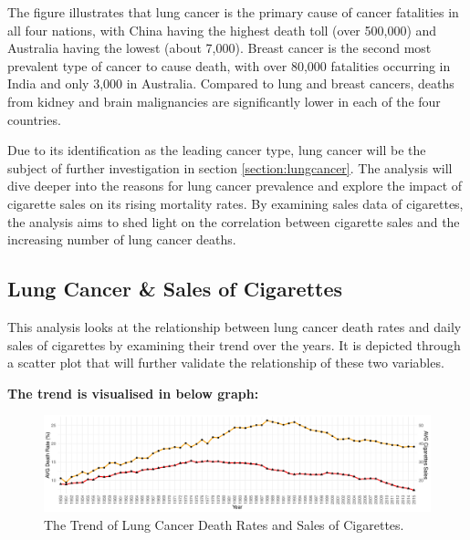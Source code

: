 \documentclass[11pt,a4paper,]{article}
\begin{document}
The figure illustrates that lung cancer is the primary cause of cancer fatalities in all four nations, with China having the highest death toll (over 500,000) and Australia having the lowest (about 7,000). Breast cancer is the second most prevalent type of cancer to cause death, with over 80,000 fatalities occurring in India and only 3,000 in Australia. Compared to lung and breast cancers, deaths from kidney and brain malignancies are significantly lower in each of the four countries.

Due to its identification as the leading cancer type, lung cancer will be the subject of further investigation in section \ref{section:lungcancer}. The analysis will dive deeper into the reasons for lung cancer prevalence and explore the impact of cigarette sales on its rising mortality rates. By examining sales data of cigarettes, the analysis aims to shed light on the correlation between cigarette sales and the increasing number of lung cancer deaths.

\hypertarget{lung-cancer-sales-of-cigarettes-1}{%
\subsection{\texorpdfstring{Lung Cancer \& Sales of Cigarettes \label{section:lungcancer}}{Lung Cancer \& Sales of Cigarettes }}\label{lung-cancer-sales-of-cigarettes-1}}

This analysis looks at the relationship between lung cancer death rates and daily sales of cigarettes by examining their trend over the years. It is depicted through a scatter plot that will further validate the relationship of these two variables.

\textbf{The trend is visualised in below graph:}

\begin{figure}

{\centering \includegraphics[width=1\linewidth]{etc5513_assignment2_g1_t1_files/figure-latex/Trend1-1} 

}

\caption{The Trend of Lung Cancer Death Rates and Sales of Cigarettes.}\label{fig:Trend1}
\end{figure}
\end{document}
